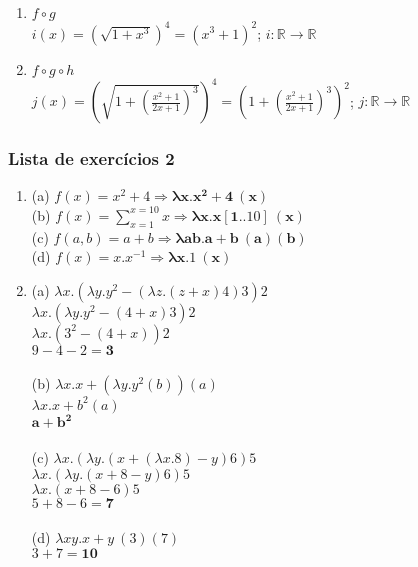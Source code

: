 \documentclass{article}
\begin{document}
\begin{enumerate}
    \begin{enumerate}
        \item $f \circ g$ \\ $i(x) = (\sqrt{1+x^3})^4 = (x^3 + 1)^2$; $i : \mathbb{R} \rightarrow \mathbb{R}$
        \item $f \circ g \circ h$ \\ $j(x) = \left(\sqrt{1 + (\frac{x^2 + 1}{2x + 1})^3}\right)^4 = \left(1 + (\frac{x^2 + 1}{2x + 1})^3\right)^2$; $j : \mathbb{R} \rightarrow \mathbb{R}$
    \end{enumerate}
\end{enumerate}

\subsubsection*{Lista de exercícios 2}
\begin{enumerate}\bfseries
    \item (a) $f(x) = x^2 + 4 \Rightarrow \mathbf{\lambda x.x^2 + 4\ (x)}$ \\
    (b) $f(x) = \sum_{x=1}^{x=10} x \Rightarrow \mathbf{\lambda x.x[1..10]\  (x)}$ \\
    (c) $f(a, b) = a + b \Rightarrow \mathbf{\lambda ab.a+b\ (a)(b)}$ \\
    (d) $f(x) = x.x^{-1} \Rightarrow \mathbf{\lambda x.1\ (x)}$

    \item (a) $\lambda x.(\lambda y.y^2 - (\lambda z.(z+x)4)3)2$ \\
    $\lambda x.(\lambda y.y^2 - (4+x)3)2$ \\
    $\lambda x.(3^2 - (4+x))2$ \\
    $9 - 4 - 2 = \mathbf{3}$ \\ \\
    (b) $\lambda x.x + (\lambda y.y^2(b))(a)$ \\
    $\lambda x.x + b^2 (a)$ \\
    $\mathbf{a + b^2}$ \\ \\
    (c) $\lambda x.(\lambda y.(x + (\lambda x.8) - y)6)5$ \\
    $\lambda x.(\lambda y.(x + 8 - y)6)5$ \\
    $\lambda x.(x + 8 - 6)5$ \\
    $5 + 8 - 6 = \mathbf{7}$ \\ \\
    (d) $\lambda xy.x + y\ (3)(7)$ \\
    $3 + 7 = \mathbf{10}$

\end{enumerate}
\end{document}
